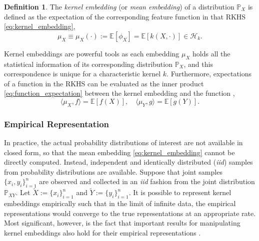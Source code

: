 \documentclass[twoside]{article} \usepackage{aistats2017}
\theoremstyle{definition}
\newtheorem{definition}{Definition}[section]
\theoremstyle{theorem}
\newcommand{\rv}[1]{{#1}}
\newcommand{\ds}[1]{\tilde{#1}}
\newcommand{\extra}[1]{{\color{ForestGreen} #1}}
\newcommand{\expect}[1]{{\mathbb{E}[#1]}}
\newcommand{\inner}[2]{{\langle #1, #2 \rangle}}
\newcommand{\Hk}{\mathcal{H}_{k}}
\newcommand{\muX}{\mu_{\rv{X}}}
\newcommand{\muY}{\mu_{\rv{Y}}}
\newcommand{\phiX}{\phi_{\rv{X}}}
\begin{document}
%
		
		\begin{definition} \label{def:kernel_embedding}
			\citep{smola2007hilbert}
			The \textit{kernel embedding} (or \textit{mean embedding}) of a distribution $\mathbb{P}_{\rv{X}}$ is defined as the expectation of the corresponding feature function in that RKHS \eqref{eq:kernel_embedding},
			\begin{equation}
				\muX \equiv \muX(\cdot) := \expect{\phiX} = \expect{k(\rv{X}, \cdot)} \in \Hk.
			\label{eq:kernel_embedding}
			\end{equation}
		\end{definition}
		
		Kernel embeddings are powerful tools as each embedding $\muX$ holds all the statistical information of its corresponding distribution $\mathbb{P}_{\rv{X}}$, and this correspondence is unique for a characteristic kernel $k$. Furthermore, expectations of a function in the RKHS can be evaluated as the inner product \eqref{eq:function_expectation} between the kernel embedding and the function \citep{muandet2016kernel},
		\begin{equation}
			\inner{\muX}{f} = \expect{f(\rv{X})} ,\quad \inner{\muY}{g} = \expect{g(\rv{Y})}.
		\label{eq:function_expectation}
		\end{equation}

		
		\subsubsection{Empirical Representation}
		\label{sec:background:kernel_embeddings:empirical_representation}
			
			In practice, the actual probability distributions of interest are not available in closed form, so that the mean embedding \eqref{eq:kernel_embedding} cannot be directly computed. Instead, independent and identically distributed (\textit{iid}) samples from probability distributions are available. Suppose that joint samples $\{x_{i}, y_{i}\}_{i = 1}^{n}$ are observed and collected in an \textit{iid} fashion from the joint distribution $\mathbb{P}_{\rv{X} \rv{Y}}$. Let $\ds{X} := \{x_{i}\}_{i = 1}^{n}$ and $\ds{Y} := \{y_{i}\}_{i = 1}^{n}$. It is possible to represent kernel embeddings empirically such that in the limit of infinite data, the empirical representations would converge to the true representations at an appropriate rate. Most significant, however, is the fact that important results for manipulating kernel embeddings also hold for their empirical representations \citep{muandet2016kernel}.
			
\end{document}
